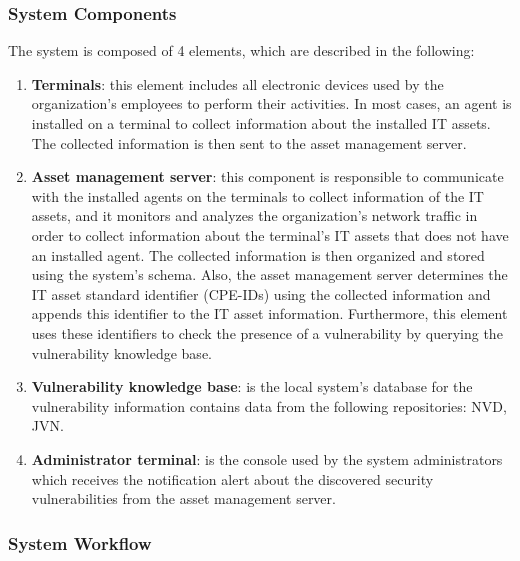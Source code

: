 \documentclass{llncs}
\begin{document}
\subsubsection {System Components }

\begin{flushleft}
 The system is composed of 4 elements, which are described in the following:
\end{flushleft}

 \begin{enumerate}
 \item \textbf{Terminals}: this element includes all electronic devices used by the organization's employees to perform their  activities. In most cases, an agent is installed on a terminal to collect information about the installed IT assets. The collected information is then sent to the asset management server.
 
 \item \textbf{Asset management server}: this component is responsible to communicate with the installed agents on the terminals to collect information of the IT assets, and it monitors and analyzes the organization's network traffic in order to collect information about the terminal's IT assets that does not have an installed agent. The collected information is then organized and stored using the system's schema. Also, the asset management server determines the IT asset standard identifier (CPE-IDs) using the collected information and appends this identifier to the  IT asset information. Furthermore, this element uses these identifiers to check the presence of a vulnerability by querying the vulnerability knowledge base.
 
 \item \textbf{Vulnerability knowledge base}: is the local system's database for the vulnerability information contains data from  the following repositories: NVD, JVN.
 
 
  \item \textbf{Administrator terminal}: is the console used by the system administrators which receives the notification alert about the discovered security vulnerabilities from the asset management server.     
 \end{enumerate}
 

\subsubsection{System Workflow }
\end{document}
